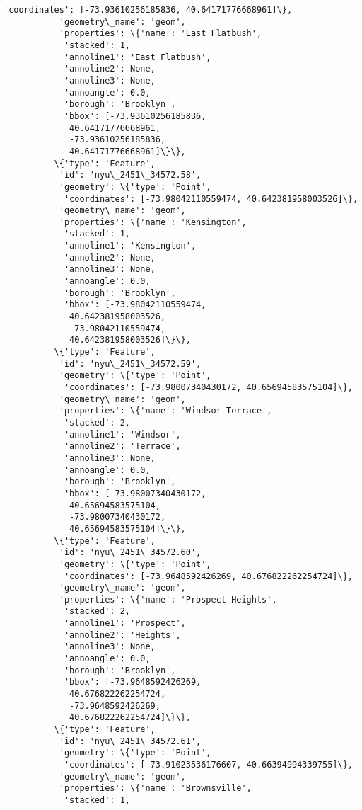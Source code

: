 \documentclass[11pt]{article}
\begin{document}
\begin{Verbatim}[commandchars=\\\{\}]
            'coordinates': [-73.93610256185836, 40.64171776668961]\},
           'geometry\_name': 'geom',
           'properties': \{'name': 'East Flatbush',
            'stacked': 1,
            'annoline1': 'East Flatbush',
            'annoline2': None,
            'annoline3': None,
            'annoangle': 0.0,
            'borough': 'Brooklyn',
            'bbox': [-73.93610256185836,
             40.64171776668961,
             -73.93610256185836,
             40.64171776668961]\}\},
          \{'type': 'Feature',
           'id': 'nyu\_2451\_34572.58',
           'geometry': \{'type': 'Point',
            'coordinates': [-73.98042110559474, 40.642381958003526]\},
           'geometry\_name': 'geom',
           'properties': \{'name': 'Kensington',
            'stacked': 1,
            'annoline1': 'Kensington',
            'annoline2': None,
            'annoline3': None,
            'annoangle': 0.0,
            'borough': 'Brooklyn',
            'bbox': [-73.98042110559474,
             40.642381958003526,
             -73.98042110559474,
             40.642381958003526]\}\},
          \{'type': 'Feature',
           'id': 'nyu\_2451\_34572.59',
           'geometry': \{'type': 'Point',
            'coordinates': [-73.98007340430172, 40.65694583575104]\},
           'geometry\_name': 'geom',
           'properties': \{'name': 'Windsor Terrace',
            'stacked': 2,
            'annoline1': 'Windsor',
            'annoline2': 'Terrace',
            'annoline3': None,
            'annoangle': 0.0,
            'borough': 'Brooklyn',
            'bbox': [-73.98007340430172,
             40.65694583575104,
             -73.98007340430172,
             40.65694583575104]\}\},
          \{'type': 'Feature',
           'id': 'nyu\_2451\_34572.60',
           'geometry': \{'type': 'Point',
            'coordinates': [-73.9648592426269, 40.676822262254724]\},
           'geometry\_name': 'geom',
           'properties': \{'name': 'Prospect Heights',
            'stacked': 2,
            'annoline1': 'Prospect',
            'annoline2': 'Heights',
            'annoline3': None,
            'annoangle': 0.0,
            'borough': 'Brooklyn',
            'bbox': [-73.9648592426269,
             40.676822262254724,
             -73.9648592426269,
             40.676822262254724]\}\},
          \{'type': 'Feature',
           'id': 'nyu\_2451\_34572.61',
           'geometry': \{'type': 'Point',
            'coordinates': [-73.91023536176607, 40.66394994339755]\},
           'geometry\_name': 'geom',
           'properties': \{'name': 'Brownsville',
            'stacked': 1,

\end{Verbatim}
\end{document}

